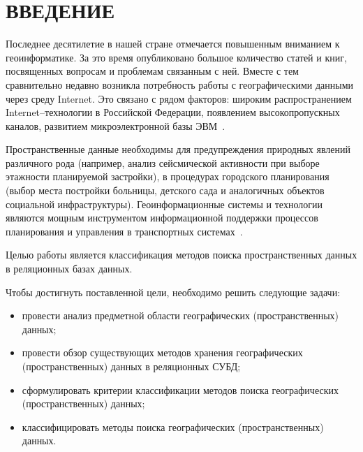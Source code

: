 \chapter*{ВВЕДЕНИЕ}


Последнее десятилетие в нашей стране отмечается повышенным вниманием к геоинформатике.
За это время опубликовано большое количество статей и книг, посвященных вопросам и проблемам связанным с ней.
Вместе с тем сравнительно недавно возникла потребность работы с географическими данными через среду Internet.
Это связано с рядом факторов: широким распространением Internet--технологии в Российской Федерации, появлением высокопропускных каналов, развитием микроэлектронной базы ЭВМ~\cite{intro-1}.

Пространственные данные необходимы для предупреждения природных явлений различного рода (например, анализ сейсмической активности при выборе этажности планируемой застройки), в процедурах городского планирования (выбор места постройки больницы, детского сада и аналогичных объектов социальной инфраструктуры).
Геоинформационные системы и технологии являются мощным инструментом информационной поддержки процессов планирования и управления в транспортных системах~\cite{transport-geo}.

Целью работы является классификация методов поиска пространственных данных в реляционных базах данных.

Чтобы достигнуть поставленной цели, необходимо решить следующие задачи:
\begin{itemize}
    \item провести анализ предметной области географических (пространственных) данных;
    \item провести обзор существующих методов хранения географических (пространственных) данных в реляционных СУБД;
    \item сформулировать критерии классификации методов поиска географических (пространственных) данных;
    \item классифицировать методы поиска географических (пространственных) данных.
\end{itemize}
